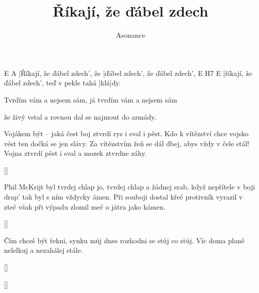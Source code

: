 \documentclass{song}
\title{Říkají, že ďábel zdech}
\author{Asonance}
\begin{document}
E                            A
|Říkají, že ďábel zdech', že |ďábel zdech', že ďábel zdech',
E                                          H7  E
|říkají, že ďábel zdech', teď v pekle tahá |klá|dy.

Tvrdím vám a nejsem sám, já tvrdím vám a nejsem sám

že živý vstal a rovnou dal se najmout do armády.
\endstrophe

\strophe *
Vojákem být -- jaká čest boj ztvrdí rys i sval i pěst.
Kdo k vítězství chce vojsko vést ten dočká se jen slávy.
Za vítězstvím žeň se dál dbej, abys vždy v čele stál!
Vojna ztvrdí pěst i sval a mozek ztvrdne záhy.
\endstrophe

\ref{}

\strophe*
Phil McKrijt byl tvrdej chlap jo, tvrdej chlap a žádnej srab,
když nepřítele v boji drap' tak byl s ním vždycky ámen.
Při souboji dostal křeč protivník vyrazil v zteč
však při výpadu zlomil meč o játra jako kámen.
\endstrophe

\ref{}

\strophe*
Čím chceš být řekni, synku můj dnes rozhodni se stůj co stůj.
Víc doma planě nelelkuj a nezahálej stále.
\endstrophe

\ref{}

\ref{}
\end{document}
